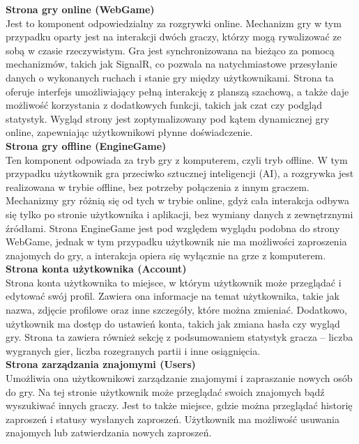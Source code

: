 \documentclass[12pt,a4paper]{article}
\begin{document}
\noindent \textbf{Strona gry online (WebGame)}\\
Jest to komponent odpowiedzialny za rozgrywki online. Mechanizm gry w tym przypadku oparty jest na interakcji dwóch graczy, którzy mogą rywalizować ze sobą w czasie rzeczywistym. Gra jest synchronizowana na bieżąco za pomocą mechanizmów, takich jak SignalR, co pozwala na natychmiastowe przesyłanie danych o wykonanych ruchach i stanie gry między użytkownikami. Strona ta oferuje interfejs umożliwiający pełną interakcję z planszą szachową, a także daje możliwość korzystania z dodatkowych funkcji, takich jak czat czy podgląd statystyk. Wygląd strony jest zoptymalizowany pod kątem dynamicznej gry online, zapewniając użytkownikowi płynne doświadczenie.
\\

\noindent \textbf{Strona gry offline (EngineGame)}\\
Ten komponent odpowiada za tryb gry z komputerem, czyli tryb offline. W tym przypadku użytkownik gra przeciwko sztucznej inteligencji (AI), a rozgrywka jest realizowana w trybie offline, bez potrzeby połączenia z innym graczem. Mechanizmy gry różnią się od tych w trybie online, gdyż cała interakcja odbywa się tylko po stronie użytkownika i aplikacji, bez wymiany danych z zewnętrznymi źródłami. Strona EngineGame jest pod względem wyglądu podobna do strony WebGame, jednak w tym przypadku użytkownik nie ma możliwości zaproszenia znajomych do gry, a interakcja opiera się wyłącznie na grze z komputerem.
\\

\noindent \textbf{Strona konta użytkownika (Account)}\\
Strona konta użytkownika to miejsce, w którym użytkownik może przeglądać i edytować swój profil. Zawiera ona informacje na temat użytkownika, takie jak nazwa, zdjęcie profilowe oraz inne szczegóły, które można zmieniać. Dodatkowo, użytkownik ma dostęp do ustawień konta, takich jak zmiana hasła czy wygląd gry. Strona ta zawiera również sekcję z podsumowaniem statystyk gracza – liczba wygranych gier, liczba rozegranych partii i inne osiągnięcia.
\\

\noindent \textbf{Strona zarządzania znajomymi (Users)}\\
Umożliwia ona użytkownikowi zarządzanie znajomymi i zapraszanie nowych osób do gry. Na tej stronie użytkownik może przeglądać swoich znajomych bądź wyszukiwać innych graczy. Jest to także miejsce, gdzie można przeglądać historię zaproszeń i statusy wysłanych zaproszeń. Użytkownik ma możliwość usuwania znajomych lub zatwierdzania nowych zaproszeń.
\\
\end{document}
